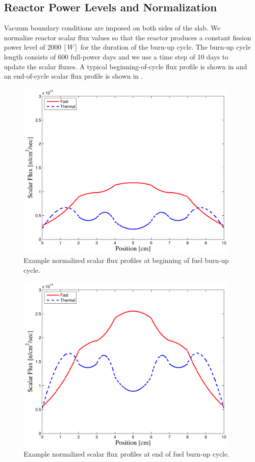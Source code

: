 \subsection{Reactor Power Levels and Normalization}

Vacuum boundary conditions are imposed on both sides of the slab.  
We normalize reactor scalar flux values so that the reactor produces a constant fission power level of $2000~[W]$ for the duration of the burn-up cycle.
The burn-up cycle length consists of 600 full-power days and we use a time step of 10 days to update the scalar fluxes.
A typical beginning-of-cycle flux profile is shown in  and an end-of-cycle scalar flux profile is shown in .  
\begin{figure}[!htp]
\centering
\includegraphics[width=11cm]{chapter5_depletion/P1_Lobatto_full_80_cells_t_steps60_End_600_Power_2000__BOC_Flux.pdf}
\caption{Example normalized scalar flux profiles at beginning of fuel burn-up cycle.}
\label{fig:ex_boc_cycle}
\end{figure}
%
\begin{figure}[!htp]
\centering
\includegraphics[width=11cm]{chapter5_depletion/P1_Lobatto_full_80_cells_t_steps60_End_600_Power_2000__EOC_Flux.pdf}
\caption{Example normalized scalar flux profiles at end of fuel burn-up cycle.}
\label{fig:ex_eoc_cycle}
\end{figure}

